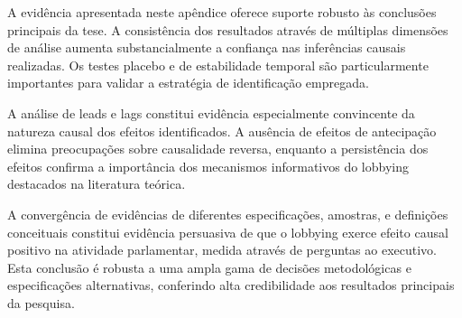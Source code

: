 A evidência apresentada neste apêndice oferece suporte robusto às conclusões principais da tese. A consistência dos resultados através de múltiplas dimensões de análise aumenta substancialmente a confiança nas inferências causais realizadas. Os testes placebo e de estabilidade temporal são particularmente importantes para validar a estratégia de identificação empregada.

A análise de leads e lags constitui evidência especialmente convincente da natureza causal dos efeitos identificados. A ausência de efeitos de antecipação elimina preocupações sobre causalidade reversa, enquanto a persistência dos efeitos confirma a importância dos mecanismos informativos do lobbying destacados na literatura teórica.

A convergência de evidências de diferentes especificações, amostras, e definições conceituais constitui evidência persuasiva de que o lobbying exerce efeito causal positivo na atividade parlamentar, medida através de perguntas ao executivo. Esta conclusão é robusta a uma ampla gama de decisões metodológicas e especificações alternativas, conferindo alta credibilidade aos resultados principais da pesquisa.

    \label{tab:robustness_specifications}
    
